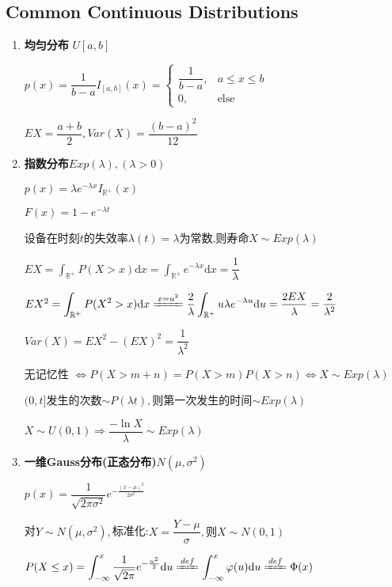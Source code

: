 \subsection{Common Continuous Distributions}
\begin{enumerate}
	\item \textbf{均匀分布} $U[a,b]$

	$p(x) = \dfrac{1}{b-a}I_{[a,b]}(x) = \left \{ \begin{matrix}\dfrac{1}{b-a}, & a\le x \le b \\0, &  \text{else}\end{matrix}\right.$

		$EX = \dfrac{a+b}{2}, Var(X) = \dfrac{(b-a)^2}{12}$

	\item \textbf{指数分布}$Exp(\lambda),(\lambda > 0)$

		$p(x) = \lambda e^{-\lambda x}I_{\mathbb{R^+}}(x)$

		$F(x) = 1-e^{-\lambda t}$

		设备在时刻$t$的失效率$\lambda(t) = \lambda$为常数,则寿命$X\sim Exp(\lambda)$

		$EX = \int_{\mathbb{R^+}}{P(X>x)\mathrm{d}x} = \int_{\mathbb{R^+}}{e^{-\lambda x}\mathrm{d}x} = \dfrac{1}{\lambda}$

		$ EX^2 = \int_{\mathbb{R^+}}{P(X^2 > x)\mathrm{d}x} \xlongequal{x = u^2} \dfrac{2}{\lambda}\int_{\mathbb{R^+}}{u\lambda e^{-\lambda u}\mathrm{d}u}
		= \dfrac{2EX}{\lambda} = \dfrac{2}{\lambda^2}$

		$Var(X) = EX^2 - (EX)^2 = \dfrac{1}{\lambda^2}$

		无记忆性 $\Leftrightarrow P(X>m+n) = P(X>m)P(X>n)\Leftrightarrow X\sim Exp(\lambda)$

	$(0,t]$发生的次数$\sim P(\lambda t),$则第一次发生的时间$\sim Exp(\lambda)$

    $ X\sim U(0,1)\Rightarrow  \dfrac{-\ln X}{\lambda}\sim Exp(\lambda)$


\item \textbf{一维Gauss分布(正态分布)}$N(\mu, \sigma^2)$

	$p(x) = \dfrac{1}{\sqrt{2\pi \sigma^2}}e^{-\frac{(x-\mu)^2}{2\sigma^2}}$

	对$Y\sim N(\mu, \sigma^2), $标准化:$X = \dfrac{Y - \mu}{\sigma},则 X\sim N(0,1)$

    $ P(X \le x) = \int_{-\infty}^{x}{\frac{1}{\sqrt{2\pi}}e^{-\frac{u^2}{2}}\mathrm{d}u} \xlongequal{def}\int_{-\infty}^{x}{\varphi(u)\mathrm{d}u}\xlongequal{def}\Phi(x)$


\end{enumerate}
